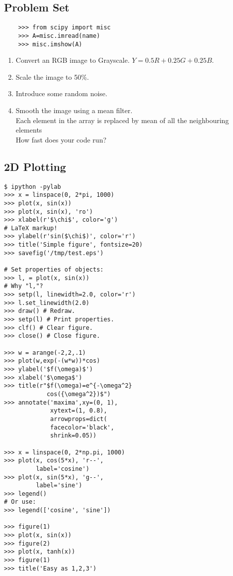 \documentclass[12pt]{article}
\begin{document}
\subsection{Problem Set}
\begin{verbatim}
    >>> from scipy import misc
    >>> A=misc.imread(name)
    >>> misc.imshow(A)
\end{verbatim}
\begin{enumerate}
  \item Convert an RGB image to Grayscale. $ Y = 0.5R + 0.25G + 0.25B $.
  \item Scale the image to 50\%.
  \item Introduce some random noise.
  \item Smooth the image using a mean filter.
  \\\small{Each element in the array is replaced by mean of all the neighbouring elements}
  \\\small{How fast does your code run?}
\end{enumerate}

\subsection{2D Plotting}
\begin{verbatim}
$ ipython -pylab
>>> x = linspace(0, 2*pi, 1000)
>>> plot(x, sin(x)) 
>>> plot(x, sin(x), 'ro')
>>> xlabel(r'$\chi$', color='g')
# LaTeX markup!
>>> ylabel(r'sin($\chi$)', color='r')
>>> title('Simple figure', fontsize=20)
>>> savefig('/tmp/test.eps')

# Set properties of objects:
>>> l, = plot(x, sin(x))
# Why "l,"?
>>> setp(l, linewidth=2.0, color='r')
>>> l.set_linewidth(2.0)
>>> draw() # Redraw.
>>> setp(l) # Print properties.
>>> clf() # Clear figure.
>>> close() # Close figure.

>>> w = arange(-2,2,.1)
>>> plot(w,exp(-(w*w))*cos)
>>> ylabel('$f(\omega)$')
>>> xlabel('$\omega$')
>>> title(r"$f(\omega)=e^{-\omega^2}
            cos({\omega^2})$")
>>> annotate('maxima',xy=(0, 1), 
             xytext=(1, 0.8), 
             arrowprops=dict(
             facecolor='black', 
             shrink=0.05))

>>> x = linspace(0, 2*np.pi, 1000)
>>> plot(x, cos(5*x), 'r--', 
         label='cosine')
>>> plot(x, sin(5*x), 'g--', 
         label='sine')
>>> legend() 
# Or use:
>>> legend(['cosine', 'sine'])

>>> figure(1)
>>> plot(x, sin(x))
>>> figure(2)
>>> plot(x, tanh(x))
>>> figure(1)
>>> title('Easy as 1,2,3')

\end{verbatim}
\end{document}

